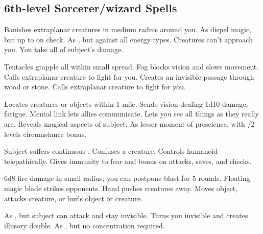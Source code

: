\subsection{6th-level Sorcerer/wizard Spells} 
\begin{swspelllist}
 Banishes extraplanar creatures in medium radius around you.
 As dispel magic, but up to  on check.
 As , but against all energy types.
 Creatures can't approach you.
 You take all of subject's damage.

 Tentacles grapple all within small spread.
 Fog blocks vision and slows movement.
 Calls extraplanar creature to fight for you.
 Creates an invisible passage through wood or stone.
 Calls extraplanar creature to fight for you.

 Locates creatures or objects within 1 mile.
 Sends vision dealing 1d10 damage, fatigue.
 Mental link lets allies communicate.
\M Lets you see all things as they really are.
\F Reveals magical aspects of subject.
 As lesser moment of prescience, with /2 levels circumstance bonus.

 Subject suffers continuous .
 Confuses a creature.
 Controls humanoid telepathically.
 Gives immunity to fear and bonus on attacks, saves, and checks.

 6d8 fire damage in small radius; you can postpone blast for 5 rounds.
\F Floating magic blade strikes opponents.
 Hand pushes creatures away.
 Moves object, attacks creature, or hurls object or creature.

 As , but subject can attack and stay invisible.
 Turns you invisible and creates illusory double.
 As , but no concentration required.
\spellheadrestricted{}


\end{swspelllist}

